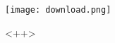 \documentclass[a4paper, 12pt]{report}
\begin{document}
\begin{titlepage}
	\begin{center}
		\texttt{[image: download.png]}
	\end{center}
\end{titlepage}

\renewcommand\thepage{}
\renewcommand{\contentsname}{Indholdsfortegnelse}
\tableofcontents
\setcounter{page}{0}
\newpage
\renewcommand\thepage{\arabic{page}}

<++>

\newpage
%
%
\end{document}
